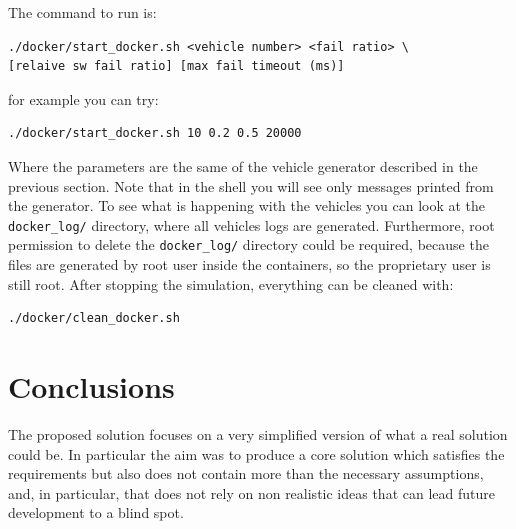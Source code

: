 \documentclass{memoir}
\begin{document}
The command to run is:
\begin{verbatim}
./docker/start_docker.sh <vehicle number> <fail ratio> \
[relaive sw fail ratio] [max fail timeout (ms)]
\end{verbatim}
for example you can try:
\begin{verbatim}
./docker/start_docker.sh 10 0.2 0.5 20000
\end{verbatim}
Where the parameters are the same of the vehicle generator described in the previous section.
Note that in the shell you will see only messages printed from the generator. To see what is happening with the vehicles you can look at the \verb|docker_log/| directory, where all vehicles logs are generated. Furthermore, root permission to delete the \verb|docker_log/| directory could be required, because the files are generated by root user inside the containers, so the proprietary user is still root.
After stopping the simulation, everything can be cleaned with:
\begin{verbatim}
./docker/clean_docker.sh
\end{verbatim}

\chapter{Conclusions}
The proposed solution focuses on a very simplified version of what a real solution could be. In particular the aim was to produce a core solution which satisfies the requirements but also does not contain more than the necessary assumptions, and, in particular, that does not rely on non realistic ideas that can lead future development to a blind spot.
\end{document}
